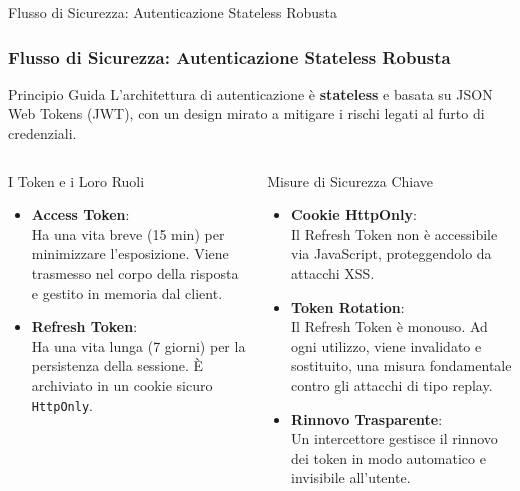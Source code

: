 \documentclass[8pt]{beamer}
\begin{document}
\begin{frame}{Flusso di Sicurezza: Autenticazione Stateless Robusta}
  \frametitle{Flusso di Sicurezza: Autenticazione Stateless Robusta}

  \begin{block}{Principio Guida}
    L'architettura di autenticazione è \textbf{stateless} e basata su JSON Web Tokens (JWT), con un design mirato a mitigare i rischi legati al furto di credenziali.
  \end{block}

  \begin{columns}[T]
    \begin{exampleblock}{I Token e i Loro Ruoli}
      \begin{itemize}
        \item \textbf{Access Token}:\\Ha una vita breve (15 min) per minimizzare l'esposizione. Viene trasmesso nel corpo della risposta e gestito in memoria dal client.

        \item \textbf{Refresh Token}:\\Ha una vita lunga (7 giorni) per la persistenza della sessione. È archiviato in un cookie sicuro \texttt{HttpOnly}.
      \end{itemize}
    \end{exampleblock}

    \begin{alertblock}{Misure di Sicurezza Chiave}
      \begin{itemize}
        \item \textbf{Cookie HttpOnly}:\\Il Refresh Token non è accessibile via JavaScript, proteggendolo da attacchi XSS.

        \item \textbf{Token Rotation}:\\Il Refresh Token è \alert{monouso}. Ad ogni utilizzo, viene invalidato e sostituito, una misura fondamentale contro gli attacchi di tipo replay.

        \item \textbf{Rinnovo Trasparente}:\\Un intercettore gestisce il rinnovo dei token in modo automatico e invisibile all'utente.
      \end{itemize}
    \end{alertblock}
  \end{columns}
\end{frame}
\end{document}
